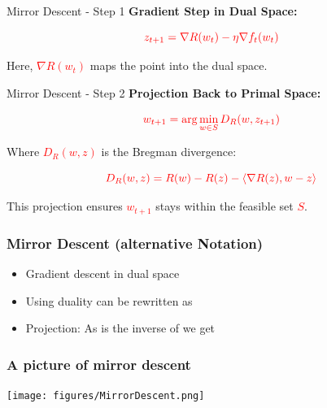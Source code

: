 \documentclass{beamer}
\begin{document}
\begin{small}
\begin{frame}{Mirror Descent - Step 1}
\textbf{Gradient Step in Dual Space:}

\begin{equation*}
\textcolor{red}{z_{t+1} = \nabla R(w_t) - \eta \nabla f_t(w_t)}
\end{equation*}

Here, \textcolor{red}{$\nabla R(w_t)$} maps the point into the dual space.
\end{frame}

\begin{frame}{Mirror Descent - Step 2}
\textbf{Projection Back to Primal Space:}

\begin{equation*}
\textcolor{red}{w_{t+1} = \arg\min_{w \in S} D_R(w, z_{t+1})}
\end{equation*}

Where \textcolor{red}{$D_R(w, z)$} is the Bregman divergence:

\begin{equation*}
\textcolor{red}{D_R(w, z) = R(w) - R(z) - \langle \nabla R(z), w - z \rangle}
\end{equation*}

This projection ensures \textcolor{red}{$w_{t+1}$} stays within the feasible set \textcolor{red}{$S$}.
\end{frame}

\begin{frame}
  \frametitle{Mirror Descent (alternative Notation)}
  \begin{itemize}
  \item Gradient descent in dual space
  \item Using duality can be rewritten as
  \item Projection: As \R{$\nabla \Phi$} is the inverse of \R{$\nabla \Phi^*$} we get
  \end{itemize}
\end{frame}


\begin{frame}
  \frametitle{A picture of mirror descent}
\texttt{[image: figures/MirrorDescent.png]}
\end{frame}



\end{small}
\end{document}
